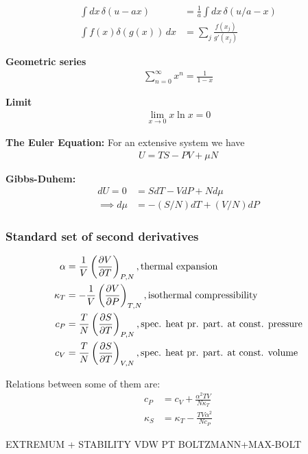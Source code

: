 \documentclass[a4paper, english, 12pt]{article}
\begin{document}
\begin{multicols*}{2}
\begin{align*}
    \int dx\,\delta(u-ax) &= \frac{1}{a}\int dx\,\delta(u/a - x) \\ 
    \int f(x)\delta(g(x))\,dx &= \sum_j \frac{f(x_j)}{g'(x_j)}
\end{align*}

\textbf{Geometric series}
\begin{align*}
    \sum_{n=0}^\infty x^n = \frac{1}{1-x}
\end{align*}

\textbf{Limit}
\begin{align*}
    \lim_{x\to0} x\ln x = 0
\end{align*}

\textbf{The Euler Equation:}
For an extensive system we have 
\begin{align*}
    U=TS-PV+\mu N
\end{align*}

\textbf{Gibbs-Duhem:}
\begin{align*}
    dU=0 &= SdT-VdP+Nd\mu \\ 
    \implies d\mu &= -(S/N)dT+(V/N)dP  
\end{align*}


\subsubsection*{\scriptsize Standard set of second derivatives}
\begin{align*}
    \alpha &= \frac{1}{V}\left(\pdv{V}{T} \right)_{P,N}, \text{thermal expansion} \\ 
    \kappa_T &= -\frac{1}{V}\left(\pdv{V}{P} \right)_{T,N}, \text{isothermal compressibility} \\ 
    c_P &= \frac{T}{N}\left(\pdv{S}{T} \right)_{P,N}, \text{spec. heat pr. part. at const. pressure} \\ 
    c_V &= \frac{T}{N}\left(\pdv{S}{T} \right)_{V,N}, \text{spec. heat pr. part. at const. volume}
\end{align*}

Relations between some of them are:
\begin{align*}
    c_P &= c_V + \frac{\alpha^2 TV}{N\kappa_T} \\ 
    \kappa_S &= \kappa_T - \frac{TV \alpha^2}{Nc_P}
\end{align*}




EXTREMUM + STABILITY 
VDW
PT 
BOLTZMANN+MAX-BOLT 

\subsection*{}


\end{multicols*}
\end{document}
